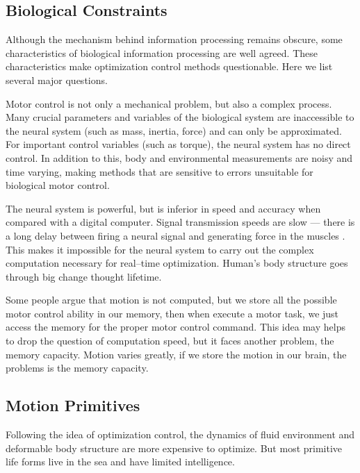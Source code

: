 \subsection*{Biological Constraints}
Although the mechanism behind information processing remains obscure, 
some characteristics of biological information processing are well agreed.
These characteristics make optimization control methods questionable. 
Here we list several major questions\citep{Glynn2003}.  
\begin{itemize}
Motor control is not only a mechanical problem, but also a complex process. Many crucial parameters and variables of the biological system are inaccessible
to the neural system (such as mass, inertia, force) and can only be approximated. For important control variables
(such as torque), the neural system has no direct control.
In addition to this, body and environmental measurements are
noisy and time varying, making methods that are sensitive to
errors unsuitable for biological motor control.

The neural system is powerful, but is inferior in speed and accuracy when compared with a digital computer. Signal transmission speeds are slow — there is a long delay between firing a neural signal and generating force
in the muscles . This makes it impossible for the neural system to carry out the complex computation necessary for real–time optimization.
Human’s body structure goes through big change thought lifetime.

Some people argue that motion is not computed, but we store all the possible motor control ability in our memory, then when execute a motor task, we just access the memory for the proper motor control command.
This idea may helps to drop the question of computation speed, but it faces another problem, the memory capacity. 
Motion varies greatly, if we store the motion in our brain, the problems is the memory capacity.
\end{itemize}

\subsection*{Motion Primitives}
Following the idea of optimization control, 
the dynamics of fluid environment and deformable body structure are more expensive to optimize. 
But most primitive life forms live in the sea and have limited intelligence. 

